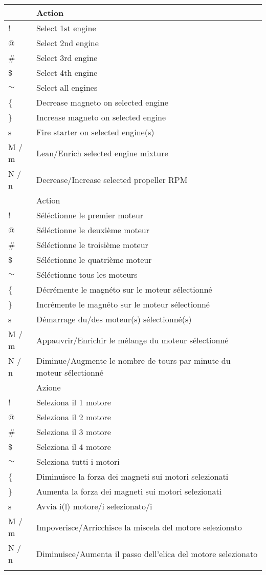 \begin{tabular}{|l|l|}\hline
\IfLanguageName{english}{
Key      &  Action\\ \hline
   !     & Select 1st engine\\
   @	   & Select 2nd engine\\
  \#     & Select 3rd engine\\
  \$     & Select 4th engine\\
  $\sim$ & Select all engines\\\hline
  \{     & Decrease magneto on selected engine\\
  \}     & Increase magneto on selected engine\\
   s     & Fire starter on selected engine(s)\\
  M / m  & Lean/Enrich selected engine mixture\\
  N / n  & Decrease/Increase selected propeller RPM\\\hline
}{}
\IfLanguageName{french}{
Touche     &  Action\\ \hline
   !     & S\'{e}l\'{e}ctionne le premier moteur\\
   @	 & S\'{e}l\'{e}ctionne le deuxi\`{e}me moteur\\
  \#     & S\'{e}l\'{e}ctionne le troisi\`{e}me moteur\\
  \$     & S\'{e}l\'{e}ctionne le quatri\`{e}me moteur\\
  $\sim$ & S\'{e}l\'{e}ctionne tous les moteurs\\\hline
  \{     & D\'{e}cr\'{e}mente le magn\'{e}to sur le moteur s\'{e}lectionn\'{e}\\
  \}     & Incr\'{e}mente le magn\'{e}to sur le moteur s\'{e}lectionn\'{e}\\
   s     & D\'{e}marrage du/des moteur(s) s\'{e}lectionn\'{e}(s)\\
  M / m  & Appauvrir/Enrichir le m\'{e}lange du moteur s\'{e}lectionn\'{e}\\
  N / n  & Diminue/Augmente le nombre de tours par minute du moteur s\'{e}lectionn\'{e}\\\hline
}{}
\IfLanguageName{italian}{
Pulsante/i &  Azione\\ \hline
   !     & Seleziona il 1\textdegree{} motore\\
   @	   & Seleziona il 2\textdegree{} motore\\
  \#     & Seleziona il 3\textdegree{} motore\\
  \$     & Seleziona il 4\textdegree{} motore\\
  $\sim$ & Seleziona tutti i motori\\\hline
  \{     & Diminuisce la forza dei magneti sui motori selezionati\\
  \}     & Aumenta la forza dei magneti sui motori selezionati\\
   s     & Avvia i(l) motore/i selezionato/i\\
  M / m  & Impoverisce/Arricchisce la miscela del motore selezionato\\
  N / n  & Diminuisce/Aumenta il passo dell'elica del motore selezionato\\\hline
}{}
\end{tabular}


